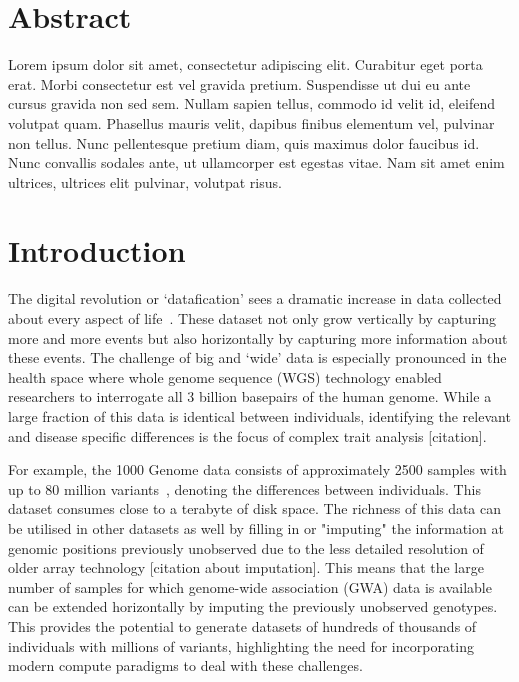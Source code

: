 \documentclass[10pt,letterpaper]{article}
\begin{document}
\section*{Abstract}
Lorem ipsum dolor sit amet, consectetur adipiscing elit. Curabitur eget porta erat. Morbi consectetur est vel gravida pretium. Suspendisse ut dui eu ante cursus gravida non sed sem. Nullam sapien tellus, commodo id velit id, eleifend volutpat quam. Phasellus mauris velit, dapibus finibus elementum vel, pulvinar non tellus. Nunc pellentesque pretium diam, quis maximus dolor faucibus id. Nunc convallis sodales ante, ut ullamcorper est egestas vitae. Nam sit amet enim ultrices, ultrices elit pulvinar, volutpat risus.

\linenumbers

\section*{Introduction}

The digital revolution or `datafication' sees a dramatic increase in data collected about every aspect of life~\cite{Loebbecke2015}. 
These dataset not only grow vertically by capturing more and more events but also horizontally by capturing more information about these events.
The challenge of big and `wide' data is especially pronounced in the health space where whole genome sequence (WGS) technology enabled researchers to interrogate all 3 billion basepairs of the human genome. 
While a large fraction of this data is identical between individuals, identifying the relevant and disease specific differences is the focus of complex trait analysis [citation]. 

For example, the 1000 Genome data consists of approximately 2500 samples with up to 80 million variants~\cite{1KG2012}, denoting the differences between individuals. 
This dataset consumes close to a terabyte of disk space.
The richness of this data can be utilised in other datasets as well by filling in or "imputing" the information at genomic positions previously unobserved due to the less detailed resolution of older array technology [citation about imputation]. 
This means that the large number of samples for which genome-wide association (GWA) data is available~\cite{Welter2013} can be extended horizontally by imputing the previously unobserved genotypes. 
This provides the potential to generate datasets of hundreds of thousands of individuals with millions of variants, highlighting the need for incorporating modern compute paradigms to deal with these challenges. 
\end{document}
